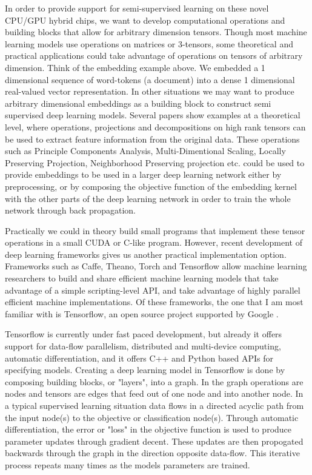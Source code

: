 In order to provide support for semi-supervised learning on these novel CPU/GPU hybrid chips, we want to develop computational operations and building blocks that allow for arbitrary dimension tensors. Though most machine learning models use operations on matrices or 3-tensors, some theoretical and practical applications could take advantage of operations on tensors of arbitrary dimension. Think of the embedding example above. We embedded a 1 dimensional sequence of word-tokens (a document) into a dense 1 dimensional real-valued vector representation. In other situations we may want to produce arbitrary dimensional embeddings as a building block to construct semi supervised deep learning models. Several papers show examples at a theoretical level, where operations, projections and decompositions on high rank tensors can be used to extract feature information from the original data\cite{cichocki2016low, cichocki2014tensor}. These operations such as Principle Components Analysis, Multi-Dimentional Scaling, Locally Preserving Projection, Neighborhood Preserving projection etc. could be used to provide embeddings to be used in a larger deep learning network either by preprocessing, or by composing the objective function of the embedding kernel with the other parts of the deep learning network in order to train the whole network through back propagation.

Practically we could in theory build small programs that implement these tensor operations in a small CUDA or C-like program. However, recent development of deep learning frameworks gives us another practical implementation option. Frameworks such as Caffe, Theano, Torch and Tensorflow allow machine learning researchers to build and share efficient machine learning models that take advantage of a simple scripting-level API, and take advantage of highly parallel efficient machine implementations. Of these frameworks, the one that I am most familiar with is Tensorflow, an open source project supported by Google \cite{abadi2016tensorflow}. 

Tensorflow is currently under fast paced development, but already it offers support for data-flow parallelism, distributed and multi-device computing, automatic differentiation, and it offers C++ and Python based APIs for specifying models. Creating a deep learning model in Tensorflow is done by composing building blocks, or "layers", into a graph. In the graph operations are nodes and tensors are edges that feed out of one node and into another node. In a typical supervised learning situation data flows in a directed acyclic path from the input node(s) to the objective or classification node(s). Through automatic differentiation, the error or "loss" in the objective function is used to produce parameter updates through gradient decent. These updates are then propogated backwards through the graph in the direction opposite data-flow. This iterative process repeats many times as the models parameters are trained.

